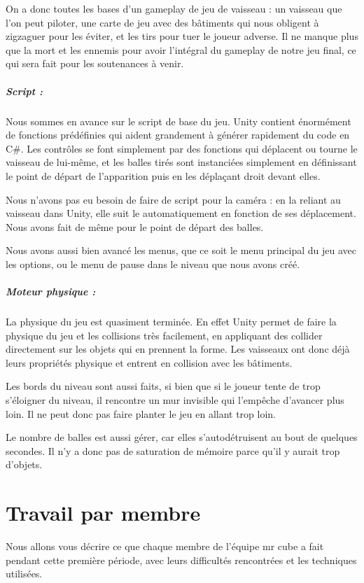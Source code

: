 \documentclass[10pt, titlepage]{report}
\begin{document}
On a donc toutes les bases d'un gameplay de jeu de vaisseau : un vaisseau que l'on peut piloter, une carte de jeu avec des bâtiments qui nous obligent à zigzaguer pour les éviter, et les tirs pour tuer le joueur adverse. Il ne manque plus que la mort et les ennemis pour avoir l'intégral du gameplay de notre jeu final, ce qui sera fait pour les soutenances à venir.

\paragraph{Script :}
Nous sommes en avance sur le script de base du jeu. Unity contient énormément de fonctions prédéfinies qui aident grandement à générer rapidement du code en C\#. Les contrôles se font simplement par des fonctions qui déplacent ou tourne le vaisseau de lui-même, et les balles tirés sont instanciées simplement en définissant le point de départ de l'apparition puis en les déplaçant droit devant elles.

 Nous n'avons pas eu besoin de faire de script pour la caméra : en la reliant au vaisseau dans Unity, elle suit le automatiquement en fonction de ses déplacement. Nous avons fait de même pour le point de départ des balles.

 Nous avons aussi bien avancé les menus, que ce soit le menu principal du jeu avec les options, ou le menu de pause dans le niveau que nous avons créé.

\paragraph{Moteur physique :}
La physique du jeu est quasiment terminée. En effet Unity permet de faire la physique du jeu et les collisions très facilement, en appliquant des collider directement sur les objets qui en prennent la forme. Les vaisseaux ont donc déjà leurs propriétés physique et entrent en collision avec les bâtiments.

 Les bords du niveau sont aussi faits, si bien que si le joueur tente de trop s'éloigner du niveau, il rencontre un mur invisible qui l'empêche d'avancer plus loin. Il ne peut donc pas faire planter le jeu en allant trop loin. 

Le nombre de balles est aussi gérer, car elles s'autodétruisent au bout de quelques secondes. Il n'y a donc pas de saturation de mémoire parce qu'il y aurait trop d'objets.

\chapter{Travail par membre}
Nous allons vous décrire ce que chaque membre de l'équipe mr cube a fait pendant cette première période, avec leurs difficultés rencontrées et les techniques utilisées.
\end{document}
